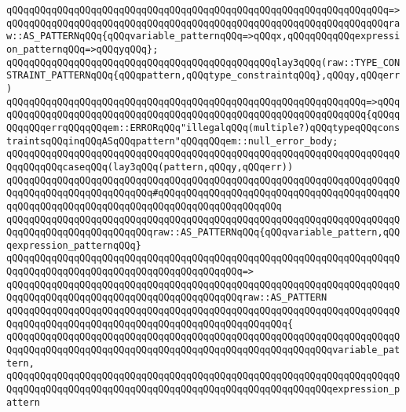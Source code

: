 \verb|qQQqqQQqqQQqqQQqqQQqqQQqqQQqqQQqqQQqqQQqqQQqqQQqqQQqqQQqqQQqqQQqqQQq=>|\newline
\verb|qQQqqQQqqQQqqQQqqQQqqQQqqQQqqQQqqQQqqQQqqQQqqQQqqQQqqQQqqQQqqQQqqQQqraw::AS_PATTERNqQQq{qQQqvariable_patternqQQq=>qQQqx,qQQqqQQqqQQqexpression_patternqQQq=>qQQqyqQQq};|\newline
\newline
\verb|qQQqqQQqqQQqqQQqqQQqqQQqqQQqqQQqqQQqqQQqqQQqqQQqlay3qQQq(raw::TYPE_CONSTRAINT_PATTERNqQQq{qQQqpattern,qQQqtype_constraintqQQq},qQQqy,qQQqerr)|\newline
\verb|qQQqqQQqqQQqqQQqqQQqqQQqqQQqqQQqqQQqqQQqqQQqqQQqqQQqqQQqqQQqqQQq=>qQQq|\newline
\verb|qQQqqQQqqQQqqQQqqQQqqQQqqQQqqQQqqQQqqQQqqQQqqQQqqQQqqQQqqQQqqQQq{qQQqqQQqqQQqerrqQQqqQQqem::ERRORqQQq"illegalqQQq(multiple?)qQQqtypeqQQqconstraintsqQQqinqQQqASqQQqpattern"qQQqqQQqem::null_error_body;|\newline
\newline
\verb|qQQqqQQqqQQqqQQqqQQqqQQqqQQqqQQqqQQqqQQqqQQqqQQqqQQqqQQqqQQqqQQqqQQqqQQqqQQqqQQqcaseqQQq(lay3qQQq(pattern,qQQqy,qQQqerr))|\newline
\verb|qQQqqQQqqQQqqQQqqQQqqQQqqQQqqQQqqQQqqQQqqQQqqQQqqQQqqQQqqQQqqQQqqQQqqQQqqQQqqQQqqQQqqQQqqQQqqQQq#qQQqqQQqqQQqqQQqqQQqqQQqqQQqqQQqqQQqqQQqqQQqqQQqqQQqqQQqqQQqqQQqqQQqqQQqqQQqqQQqqQQqqQQqqQQq|\newline
\verb|qQQqqQQqqQQqqQQqqQQqqQQqqQQqqQQqqQQqqQQqqQQqqQQqqQQqqQQqqQQqqQQqqQQqqQQqqQQqqQQqqQQqqQQqqQQqqQQqraw::AS_PATTERNqQQq{qQQqvariable_pattern,qQQqexpression_patternqQQq}|\newline
\verb|qQQqqQQqqQQqqQQqqQQqqQQqqQQqqQQqqQQqqQQqqQQqqQQqqQQqqQQqqQQqqQQqqQQqqQQqqQQqqQQqqQQqqQQqqQQqqQQqqQQqqQQqqQQqqQQq=>|\newline
\verb|qQQqqQQqqQQqqQQqqQQqqQQqqQQqqQQqqQQqqQQqqQQqqQQqqQQqqQQqqQQqqQQqqQQqqQQqqQQqqQQqqQQqqQQqqQQqqQQqqQQqqQQqqQQqqQQqraw::AS_PATTERN|\newline
\verb|qQQqqQQqqQQqqQQqqQQqqQQqqQQqqQQqqQQqqQQqqQQqqQQqqQQqqQQqqQQqqQQqqQQqqQQqqQQqqQQqqQQqqQQqqQQqqQQqqQQqqQQqqQQqqQQqqQQqqQQq{|\newline
\verb|qQQqqQQqqQQqqQQqqQQqqQQqqQQqqQQqqQQqqQQqqQQqqQQqqQQqqQQqqQQqqQQqqQQqqQQqqQQqqQQqqQQqqQQqqQQqqQQqqQQqqQQqqQQqqQQqqQQqqQQqqQQqqQQqvariable_pattern,|\newline
\newline
\verb|qQQqqQQqqQQqqQQqqQQqqQQqqQQqqQQqqQQqqQQqqQQqqQQqqQQqqQQqqQQqqQQqqQQqqQQqqQQqqQQqqQQqqQQqqQQqqQQqqQQqqQQqqQQqqQQqqQQqqQQqqQQqqQQqexpression_pattern|\newline
